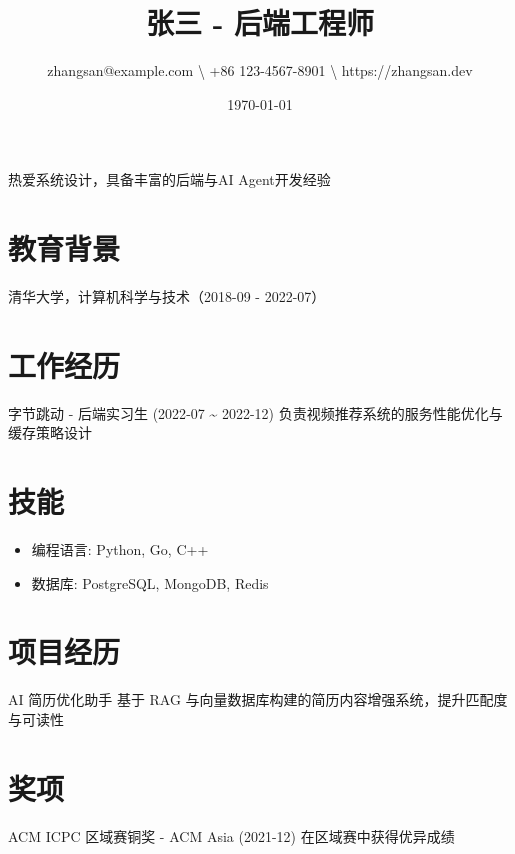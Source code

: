 \documentclass{article}%
\title{张三 {-} 后端工程师}%
\author{zhangsan@example.com \textbackslash{} +86 123{-}4567{-}8901 \textbackslash{} https://zhangsan.dev}%
\date{\today}%
\begin{document}
%
\normalsize%
\maketitle%
热爱系统设计，具备丰富的后端与AI Agent开发经验%
\newline%
\newline%
\section{教育背景}%
\label{sec:}%
清华大学，计算机科学与技术（2018{-}09 {-} 2022{-}07）%
\newline

%
\section{工作经历}%
\label{sec:}%
字节跳动 {-} 后端实习生 (2022{-}07 \textasciitilde{} 2022{-}12)%
\newline%
负责视频推荐系统的服务性能优化与缓存策略设计%
\newline

%
\section{技能}%
\label{sec:}%
\begin{itemize}%
\item%
编程语言: Python, Go, C++%
\item%
数据库: PostgreSQL, MongoDB, Redis%
\end{itemize}

%
\section{项目经历}%
\label{sec:}%
AI 简历优化助手%
\newline%
基于 RAG 与向量数据库构建的简历内容增强系统，提升匹配度与可读性%
\newline

%
\section{奖项}%
\label{sec:}%
ACM ICPC 区域赛铜奖 {-} ACM Asia (2021{-}12)%
\newline%
在区域赛中获得优异成绩%
\newline

%
\end{document}
